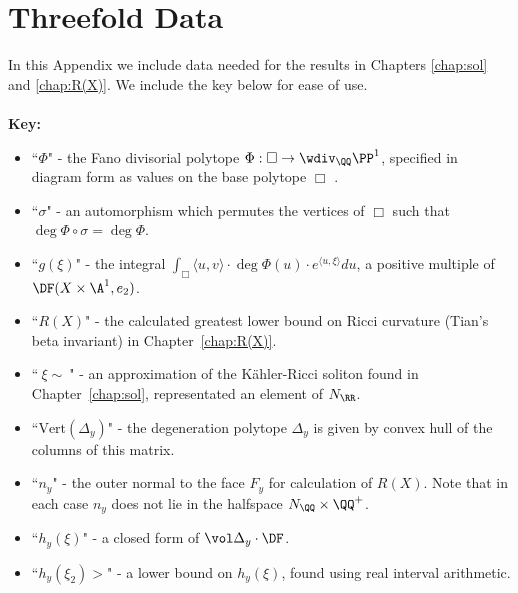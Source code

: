 \chapter{Threefold Data}
\label{appendix1}
\renewcommand{\thefootnote}{\fnsymbol{footnote}} 
\setcounter{footnote}{0}
In this Appendix we include data needed for the results in Chapters \ref{chap:sol} and \ref{chap:R(X)}. We include the key below for ease of use. \\ \\
\textbf{Key:}
\begin{itemize}
\item ``\(\Phi\)" - the Fano divisorial polytope \(\Phi: \Box \to \wdiv_\QQ \PP^1\), specified in diagram form as values on the base polytope \(\Box\) .
\item ``\(\sigma \)" - an automorphism which permutes the vertices of \(\Box\) such that \(\deg \Phi \circ \sigma = \deg \Phi\).
\item ``\(g(\xi)\)" - the integral \(\int_\Box \langle u, v \rangle \cdot \deg \Phi (u) \cdot e^{\langle u, \xi \rangle} du\), a positive multiple of \(\DF(X \times \A^1, e_2)\).
\item ``\(R(X)\)" - the calculated greatest lower bound on Ricci curvature (Tian's beta invariant) in Chapter~\ref{chap:R(X)}.
\item ``\( \ \xi \sim \ \)" - an approximation of the K\"ahler-Ricci soliton found in Chapter~\ref{chap:sol}, representated an element of \(N_\RR\).
\item ``\(\text{Vert}(\Delta_y)\)" - the degeneration polytope \(\Delta_y\) is given by convex hull of the columns of this matrix.
\item ``\(n_y\)" - the outer normal to the face \(F_y\) for calculation of \(R(X)\). Note that in each case \(n_y\) does not lie in the halfspace \(N_\QQ \times \QQ^+\).
\item ``\(h_y(\xi)\)" - a closed form of \(\vol \Delta_y \cdot \DF \).
\item ``\(h_y(\xi_2) >\)" - a lower bound on \(h_y(\xi)\), found using real interval arithmetic.
\end{itemize}

